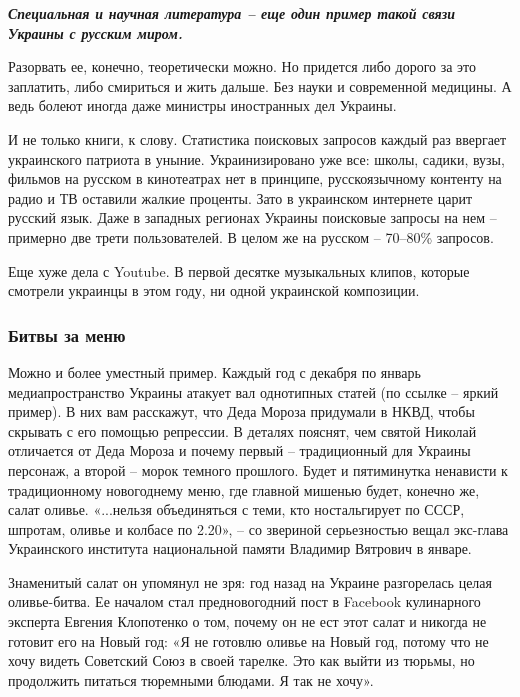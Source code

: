 \begin{leftbar}
  \begingroup
    \em\large\bfseries\color{blue}
    Специальная и научная литература – еще один пример такой связи Украины с русским миром.
  \endgroup
\end{leftbar}

Разорвать ее, конечно, теоретически можно. Но придется либо дорого за это
заплатить, либо смириться и жить дальше. Без науки и современной медицины. А
ведь болеют иногда даже министры иностранных дел Украины. 

И не только книги, к слову. Статистика поисковых запросов каждый раз ввергает
украинского патриота в уныние. Украинизировано уже все: школы, садики, вузы,
фильмов на русском в кинотеатрах нет в принципе, русскоязычному контенту на
радио и ТВ оставили жалкие проценты. Зато в украинском интернете царит русский
язык. Даже в западных регионах Украины поисковые запросы на нем – примерно две
трети пользователей. В целом же на русском – 70–80\% запросов.

Еще хуже дела с Youtube. В первой десятке музыкальных клипов, которые смотрели
украинцы в этом году, ни одной украинской композиции. 

\subsubsection{Битвы за меню}

Можно и более уместный пример. Каждый год с декабря по январь медиапространство
Украины атакует вал однотипных статей (по ссылке – яркий пример). В них вам
расскажут, что Деда Мороза придумали в НКВД, чтобы скрывать с его помощью
репрессии. В деталях пояснят, чем святой Николай отличается от Деда Мороза и
почему первый – традиционный для Украины персонаж, а второй – морок темного
прошлого. Будет и пятиминутка ненависти к традиционному новогоднему меню, где
главной мишенью будет, конечно же, салат оливье. «...нельзя объединяться с
теми, кто ностальгирует по СССР, шпротам, оливье и колбасе по 2.20», – со
звериной серьезностью вещал экс-глава Украинского института национальной памяти
Владимир Вятрович в январе. 

Знаменитый салат он упомянул не зря: год назад на Украине разгорелась целая
оливье-битва. Ее началом стал предновогодний пост в Facebook кулинарного
эксперта Евгения Клопотенко о том, почему он не ест этот салат и никогда не
готовит его на Новый год: «Я не готовлю оливье на Новый год, потому что не хочу
видеть Советский Союз в своей тарелке. Это как выйти из тюрьмы, но продолжить
питаться тюремными блюдами. Я так не хочу». 

